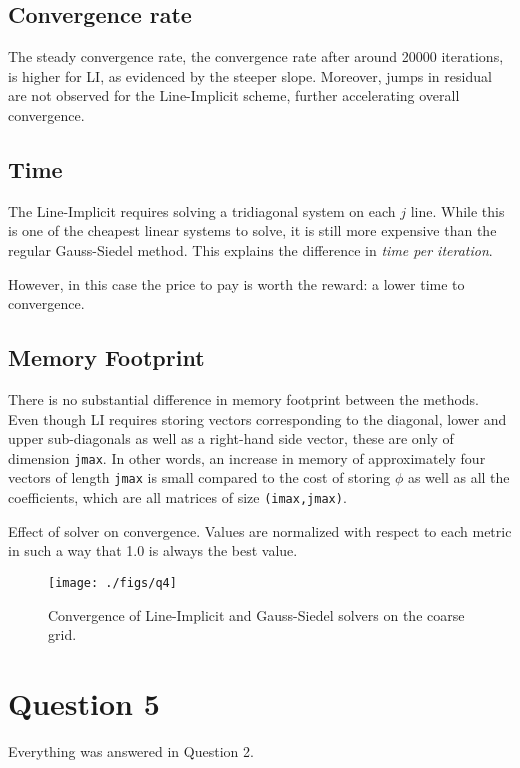 \documentclass{SelimArticle}
\begin{document}
\subsection{Convergence rate}
The steady convergence rate, the convergence rate after around 20000 iterations, is
higher for LI, as evidenced by the steeper slope. Moreover, jumps in residual are not
observed for the Line-Implicit scheme, further accelerating overall convergence.

\subsection{Time}
The Line-Implicit requires solving a tridiagonal system on each $j$ line. While this is
one of the cheapest linear systems to solve, it is still more expensive than the regular
Gauss-Siedel method. This explains the difference in \textit{time per iteration}.

However, in this case the price to pay is worth the reward: a lower time to convergence.

\subsection{Memory Footprint}
There is no substantial difference in memory footprint between the methods. Even though LI requires
storing vectors corresponding to the diagonal, lower and upper sub-diagonals as well as a right-hand
side vector, these are only of dimension \texttt{jmax}. In other words, an increase in memory
of approximately four vectors of length \texttt{jmax} is small compared to the cost of storing
$\phi$ as well as all the coefficients, which are all matrices of size \texttt{(imax,jmax)}.

\begin{table}[H]
    \centering
    \caption{Effect of solver on convergence. Values are normalized with respect to each metric
        in such a way that 1.0 is always the best value.}
    \label{tab:q4}
    
\end{table}

\begin{figure}[H]
    \centering
    \texttt{[image: ./figs/q4]}
    \caption{Convergence of Line-Implicit and Gauss-Siedel solvers on the coarse grid.}\label{fig:q4}
\end{figure}

\section{Question 5}
Everything was answered in Question 2.
\end{document}
